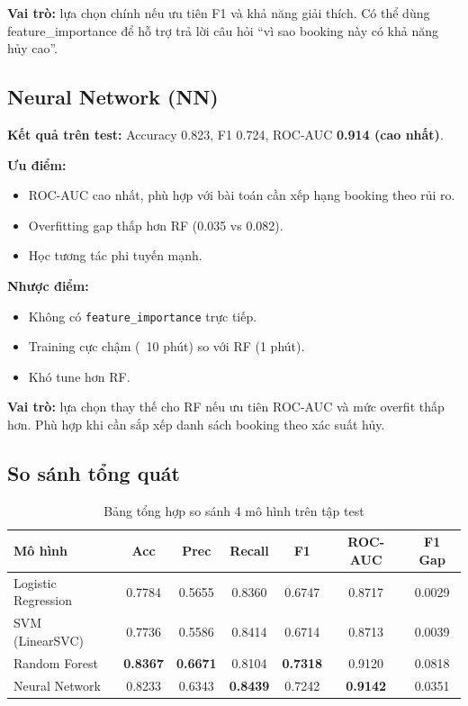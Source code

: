 \documentclass[12pt, a4paper]{article}
\begin{document}
\textbf{Vai trò:} lựa chọn chính nếu ưu tiên F1 và khả năng giải thích. Có thể dùng feature\_importance để hỗ trợ trả lời câu hỏi ``vì sao booking này có khả năng hủy cao''.

\subsection{Neural Network (NN)}

\textbf{Kết quả trên test:} Accuracy 0.823, F1 0.724, ROC-AUC \textbf{0.914 (cao nhất)}.

\textbf{Ưu điểm:}
\begin{itemize}
    \item ROC-AUC cao nhất, phù hợp với bài toán cần xếp hạng booking theo rủi ro.
    \item Overfitting gap thấp hơn RF (0.035 vs 0.082).
    \item Học tương tác phi tuyến mạnh.
\end{itemize}

\textbf{Nhược điểm:}
\begin{itemize}
    \item Không có \texttt{feature\_importance} trực tiếp.
    \item Training cực chậm (~10 phút) so với RF (1 phút).
    \item Khó tune hơn RF.
\end{itemize}

\textbf{Vai trò:} lựa chọn thay thế cho RF nếu ưu tiên ROC-AUC và mức overfit thấp hơn. Phù hợp khi cần sắp xếp danh sách booking theo xác suất hủy.

\subsection{So sánh tổng quát}

\begin{table}[h!]
\centering
\caption{Bảng tổng hợp so sánh 4 mô hình trên tập test}
\renewcommand{\arraystretch}{1.3}
\begin{tabular}{|l|c|c|c|c|c|c|}
\hline
\textbf{Mô hình} & \textbf{Acc} & \textbf{Prec} & \textbf{Recall} & \textbf{F1} & \textbf{ROC-AUC} & \textbf{F1 Gap} \\ \hline
Logistic Regression & 0.7784 & 0.5655 & 0.8360 & 0.6747 & 0.8717 & 0.0029 \\ \hline
SVM (LinearSVC)     & 0.7736 & 0.5586 & 0.8414 & 0.6714 & 0.8713 & 0.0039 \\ \hline
Random Forest       & \textbf{0.8367} & \textbf{0.6671} & 0.8104 & \textbf{0.7318} & 0.9120 & 0.0818 \\ \hline
Neural Network      & 0.8233 & 0.6343 & \textbf{0.8439} & 0.7242 & \textbf{0.9142} & 0.0351 \\ \hline
\end{tabular}
\end{table}
\end{document}
